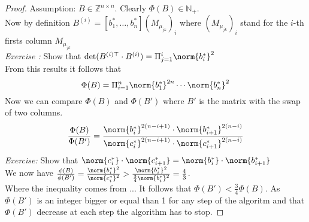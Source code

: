 \documentclass[a4paper,11pt,american]{article}
\newcommand{\N}{\mathbb{N}}
\newcommand{\Z}{\mathbb{Z}}
\theoremstyle{plain}
\theoremstyle{definition}
\begin{document}
\begin{proof}
    Assumption: $B\in\Z^{n\times n}$. Clearly $\Phi(B)\in\N_+$.\\
    Now by definition $B^{(i)}=[b_1^*,\dots,b_n^*](M_{\mu_{jk}})_i$ where $(M_{\mu_{jk}})_i$ stand for the $i$-th firsts column $M_{\mu_{jk}}$\\
    \emph{Exercise :} Show that $\det(B^{(i)\top}\cdot B^{(i)})=\Pi^i_{j=1}\norm{b_i^*}^2$\\
    From this results it follows that $$\Phi(B)=\Pi_{i=1}^n\norm{b_1^*}^{2n}\cdots\norm{b_n^*}^2$$
    Now we can compare $\Phi(B)$ and $\Phi(B')$ where $B'$ is the matrix with the swap of two columns.
    $$\frac{\Phi(B)}{\Phi(B')}=\frac{\norm{b_i^*}^{2(n-i+1)}\cdot\norm{b_{i+1}^*}^{2(n-i)}}{\norm{c_i^*}^{2(n-i+1)}\cdot\norm{c_{i+1}^*}^{2(n-i)}}$$
    \emph{Exercise:} Show that $\norm{c_i^*}\cdot\norm{c_{i+1}^*}=\norm{b_i^*}\cdot\norm{b_{i+1}^*}$\\
    We now have $\frac{\phi(B)}{\phi(B')}=\frac{\norm{b_i^*}^2}{\norm{c_i^*}^2}>\frac{\norm{b_i^*}^2}{\frac{3}{4}\norm{b_i^*}^2}=\frac{4}{3}$.\\
    Where the inequality comes from ...
    It follows that $\Phi(B')<\frac{3}{4}\Phi(B)$. As $\Phi(B')$ is an integer bigger or equal than 1 for any step of the algoritm and that $\Phi(B')$ decrease at each step the algorithm has to stop. 
\end{proof}



\end{document}
